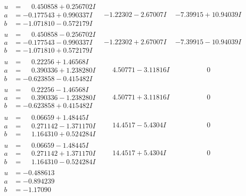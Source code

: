 \documentclass[1p]{elsarticle_modified}
\theoremstyle{definition}
\begin{document}
$$\begin{array}{c|c|c}
\begin{aligned}
u &= \phantom{-}0.450858 + 0.256702 I \\
a &= -0.177543 + 0.990337 I \\
b &= -1.071810 - 0.572179 I\end{aligned}
 & -1.22302 - 2.67007 I & -7.39915 + 10.94039 I \\ \hline\begin{aligned}
u &= \phantom{-}0.450858 - 0.256702 I \\
a &= -0.177543 - 0.990337 I \\
b &= -1.071810 + 0.572179 I\end{aligned}
 & -1.22302 + 2.67007 I & -7.39915 - 10.94039 I \\ \hline\begin{aligned}
u &= \phantom{-}0.22256 + 1.46568 I \\
a &= \phantom{-}0.390336 + 1.238280 I \\
b &= -0.623858 - 0.415482 I\end{aligned}
 & \phantom{-}4.50771 - 3.11816 I & \phantom{-0.000000 } 0 \\ \hline\begin{aligned}
u &= \phantom{-}0.22256 - 1.46568 I \\
a &= \phantom{-}0.390336 - 1.238280 I \\
b &= -0.623858 + 0.415482 I\end{aligned}
 & \phantom{-}4.50771 + 3.11816 I & \phantom{-0.000000 } 0 \\ \hline\begin{aligned}
u &= \phantom{-}0.06659 + 1.48445 I \\
a &= \phantom{-}0.271142 - 1.371170 I \\
b &= \phantom{-}1.164310 + 0.524284 I\end{aligned}
 & \phantom{-}14.4517 - 5.4304 I & \phantom{-0.000000 } 0 \\ \hline\begin{aligned}
u &= \phantom{-}0.06659 - 1.48445 I \\
a &= \phantom{-}0.271142 + 1.371170 I \\
b &= \phantom{-}1.164310 - 0.524284 I\end{aligned}
 & \phantom{-}14.4517 + 5.4304 I & \phantom{-0.000000 } 0 \\ \hline\begin{aligned}
u &= -0.488613\phantom{ +0.000000I} \\
a &= -0.894239\phantom{ +0.000000I} \\
b &= -1.17090\phantom{ +0.000000I}\end{aligned}

\end{array}$$
\end{document}
